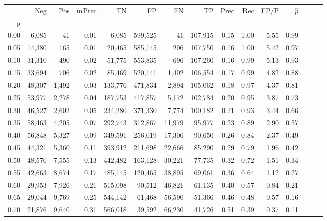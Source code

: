 \begin{tabular}{rrrrrrrrrrrrrrr}
\toprule
{} &     Neg &    Pos & mPrec &       TN &       FP &       FN &       TP &  Prec &   Rec &  FP/P & $\hat{p}$ \\
p    &         &        &       &          &          &          &          &       &       &       &           \\
\midrule
0.00 &   6,085 &     41 &  0.01 &    6,085 &  599,525 &       41 &  107,915 &  0.15 &  1.00 &  5.55 &      0.99 \\
0.05 &  14,380 &    165 &  0.01 &   20,465 &  585,145 &      206 &  107,750 &  0.16 &  1.00 &  5.42 &      0.97 \\
0.10 &  31,310 &    490 &  0.02 &   51,775 &  553,835 &      696 &  107,260 &  0.16 &  0.99 &  5.13 &      0.93 \\
0.15 &  33,694 &    706 &  0.02 &   85,469 &  520,141 &    1,402 &  106,554 &  0.17 &  0.99 &  4.82 &      0.88 \\
0.20 &  48,307 &  1,492 &  0.03 &  133,776 &  471,834 &    2,894 &  105,062 &  0.18 &  0.97 &  4.37 &      0.81 \\
0.25 &  53,977 &  2,278 &  0.04 &  187,753 &  417,857 &    5,172 &  102,784 &  0.20 &  0.95 &  3.87 &      0.73 \\
0.30 &  46,527 &  2,602 &  0.05 &  234,280 &  371,330 &    7,774 &  100,182 &  0.21 &  0.93 &  3.44 &      0.66 \\
0.35 &  58,463 &  4,205 &  0.07 &  292,743 &  312,867 &   11,979 &   95,977 &  0.23 &  0.89 &  2.90 &      0.57 \\
0.40 &  56,848 &  5,327 &  0.09 &  349,591 &  256,019 &   17,306 &   90,650 &  0.26 &  0.84 &  2.37 &      0.49 \\
0.45 &  44,321 &  5,360 &  0.11 &  393,912 &  211,698 &   22,666 &   85,290 &  0.29 &  0.79 &  1.96 &      0.42 \\
0.50 &  48,570 &  7,555 &  0.13 &  442,482 &  163,128 &   30,221 &   77,735 &  0.32 &  0.72 &  1.51 &      0.34 \\
0.55 &  42,663 &  8,674 &  0.17 &  485,145 &  120,465 &   38,895 &   69,061 &  0.36 &  0.64 &  1.12 &      0.27 \\
0.60 &  29,953 &  7,926 &  0.21 &  515,098 &   90,512 &   46,821 &   61,135 &  0.40 &  0.57 &  0.84 &      0.21 \\
0.65 &  29,044 &  9,769 &  0.25 &  544,142 &   61,468 &   56,590 &   51,366 &  0.46 &  0.48 &  0.57 &      0.16 \\
0.70 &  21,876 &  9,640 &  0.31 &  566,018 &   39,592 &   66,230 &   41,726 &  0.51 &  0.39 &  0.37 &      0.11 \\

\end{tabular}
